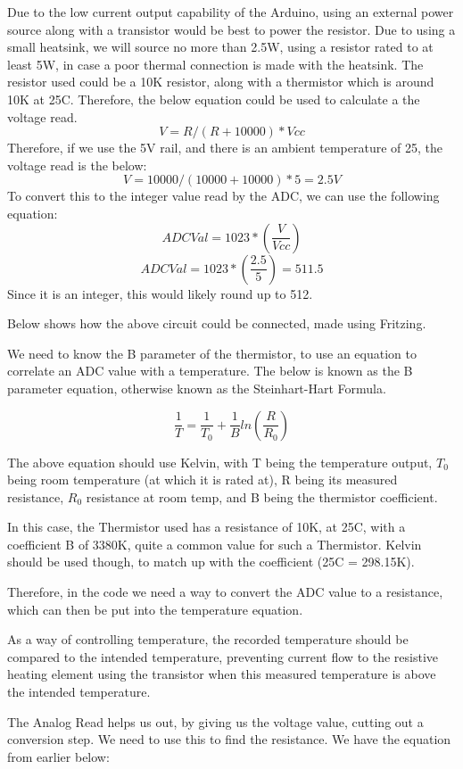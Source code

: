 \documentclass[a4paper,11pt]{report}
\begin{document}
Due to the low current output capability of the Arduino, using an external power source along with a transistor would be best to power the resistor. Due to using a small heatsink, we will source no more than 2.5W, using a resistor rated to at least 5W, in case a poor thermal connection is made with the heatsink. The resistor used could be a 10K resistor, along with a thermistor which is around 10K at 25\degree C. Therefore, the below equation could be used to calculate a the voltage read.
\[V = R / (R + 10000) * Vcc\]
Therefore, if we use the 5V rail, and there is an ambient temperature of 25, the voltage read is the below:
\[V = 10000/(10000+10000) * 5 = 2.5V\]
To convert this to the integer value read by the ADC, we can use the following equation:
\[ADCVal = 1023*(\frac{V}{Vcc})\]
\[ADCVal = 1023*(\frac{2.5}{5}) = 511.5\]
Since it is an integer, this would likely round up to 512.

Below shows how the above circuit could be connected, made using Fritzing.

We need to know the B parameter of the thermistor, to use an equation to correlate an ADC value with a temperature. The below is known as the B parameter equation, otherwise known as the Steinhart-Hart Formula.

\[\frac{1}{T} = \frac{1}{T_0} + \frac{1}{B}ln(\frac{R}{R_0})\]

The above equation should use Kelvin, with T being the temperature output, $T_0$ being room temperature (at which it is rated at), R being its measured resistance, $R_0$ resistance at room temp, and B being the thermistor coefficient.

In this case, the Thermistor used has a resistance of 10K, at 25\degree C, with a coefficient B of 3380K, quite a common value for such a Thermistor. Kelvin should be used though, to match up with the coefficient (25\degree C = 298.15\degree K).

Therefore, in the code we need a way to convert the ADC value to a resistance, which can then be put into the temperature equation.

As a way of controlling temperature, the recorded temperature should be compared to the intended temperature, preventing current flow to the resistive heating element using the transistor when this measured temperature is above the intended temperature.

The Analog Read helps us out, by giving us the voltage value, cutting out a conversion step. We need to use this to find the resistance. We have the equation from earlier below:
\end{document}
